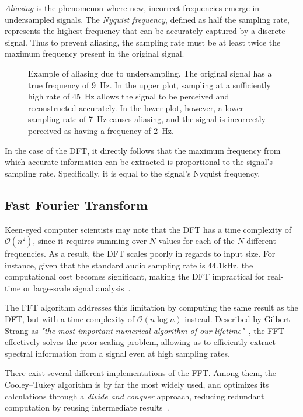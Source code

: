 \textit{Aliasing} is the phenomenon where new, incorrect frequencies emerge in undersampled signals. The \textit{Nyquist frequency}, defined as half the sampling rate, represents the highest frequency that can be accurately captured by a discrete signal. Thus to prevent aliasing, the sampling rate must be at least twice the maximum frequency present in the original signal.

\begin{figure}[H]
    \centering
    
    \caption{Example of aliasing due to undersampling. The original signal has a true frequency of 9~Hz. In the upper plot, sampling at a sufficiently high rate of 45~Hz allows the signal to be perceived and reconstructed accurately. In the lower plot, however, a lower sampling rate of 7~Hz causes aliasing, and the signal is incorrectly perceived as having a frequency of 2~Hz.}
    \label{AliasingFigure}
\end{figure}

In the case of the \gls{DFT}, it directly follows that the maximum frequency from which accurate information can be extracted is proportional to the signal's sampling rate. Specifically, it is equal to the signal's Nyquist frequency.

\subsection{Fast Fourier Transform}

Keen-eyed computer scientists may note that the \gls{DFT} has a time complexity of $\mathcal{O}(n^2)$, since it requires summing over $N$ values for each of the $N$ different frequencies. As a result, the \gls{DFT} scales poorly in regards to input size. For instance, given that the standard audio sampling rate is $44.1 \text{kHz}$, the computational cost becomes significant, making the \gls{DFT} impractical for real-time or large-scale signal analysis~\cite{pras2010sampling}.

The \gls{FFT} algorithm addresses this limitation by computing the same result as the \gls{DFT}, but with a time complexity of $\mathcal{O}(n\log{n})$ instead. Described by Gilbert Strang as \textit{"the most important numerical algorithm of our lifetime"}~\cite{strang1993wavelet}, the \gls{FFT} effectively solves the prior scaling problem, allowing us to efficiently extract spectral information from a signal even at high sampling rates.

There exist several different implementations of the \gls{FFT}. Among them, the Cooley–Tukey algorithm is by far the most widely used, and optimizes its calculations through a \textit{divide and conquer} approach, reducing redundant computation by reusing intermediate results~\cite{d3ea2d52-5ab2-3128-8b80-efb85267295d}.

